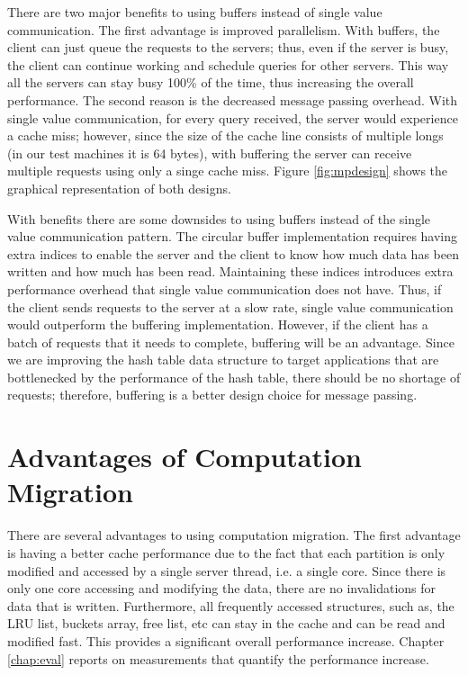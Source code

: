There are two major benefits to using buffers instead of single value communication. The first advantage is improved parallelism. 
With buffers, the client can just queue the requests to the servers; thus, even if the server is busy, the client can continue working 
and schedule queries for other servers. This way all the servers can stay busy 100\% of the time, thus increasing the overall 
performance. The second reason is the decreased message passing overhead.  With single value communication, for every query 
received, the server would experience a cache miss; however, since the size of the cache line consists of multiple longs (in our test 
machines it is 64 bytes), with buffering the server can receive multiple requests using only a singe cache miss. Figure \ref{fig:mpdesign} 
shows the graphical representation of both designs.

With benefits there are some downsides to using buffers instead of the single value communication pattern. The circular buffer 
implementation requires having extra indices to enable the server and the client to know how much data has been written 
and how much has been read. Maintaining these indices introduces extra performance overhead that single value communication 
does not have. Thus, if the client sends requests to the server at a slow rate, single value communication would 
outperform the buffering implementation. However, if the client has a batch of requests that it needs to complete, buffering will be 
an advantage. Since we are improving the hash table data structure to target applications that are bottlenecked by 
the performance of the hash table, there should be no shortage of requests; therefore, buffering is a better design choice for 
message passing.

\section{Advantages of Computation Migration}
\label{sec:compmigration}

There are several advantages to using computation migration. The first advantage is having a better cache performance 
due to the fact that each partition is only modified and accessed by a single server thread, i.e. a single core. 
Since there is only one core accessing and modifying the data, there are no invalidations for data that 
is written. Furthermore, all frequently accessed structures, such as, the LRU list, buckets array, free list, etc can stay in 
the cache and can be read and modified fast. This provides a significant overall performance increase. 
Chapter \ref{chap:eval} reports on measurements that quantify the performance increase.

